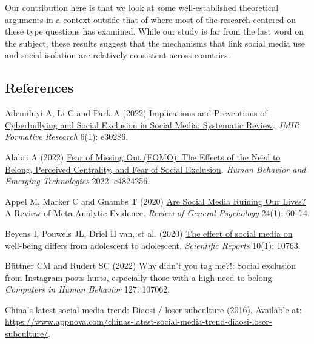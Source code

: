 \documentclass[
  letterpaper,
  DIV=11,
  numbers=noendperiod]{scrartcl}
\newlength{\cslhangindent}
\newlength{\cslentryspacingunit} %
\newenvironment{CSLReferences}[2] %
 {%
  \setlength{\parindent}{0pt}
  \ifodd #1
  \let\oldpar\par
  \def\par{\hangindent=\cslhangindent\oldpar}
  \fi
  \setlength{\parskip}{#2\cslentryspacingunit}
 }%
 {}
\begin{document}
Our contribution here is that we look at some well-established
theoretical arguments in a context outside that of where most of the
research centered on these type questions has examined. While our study
is far from the last word on the subject, these results suggest that the
mechanisms that link social media use and social isolation are
relatively consistent across countries.

\newpage{}

\hypertarget{references}{%
\subsection{References}\label{references}}

\hypertarget{refs}{}
\begin{CSLReferences}{1}{0}
\leavevmode{}%
Ademiluyi A, Li C and Park A (2022)
\href{https://doi.org/10.2196/30286}{Implications and Preventions of
Cyberbullying and Social Exclusion in Social Media: Systematic Review}.
\emph{JMIR Formative Research} 6(1): e30286.

\leavevmode{}%
Alabri A (2022) \href{https://doi.org/10.1155/2022/4824256}{Fear of
Missing Out (FOMO): The Effects of the Need to Belong, Perceived
Centrality, and Fear of Social Exclusion}. \emph{Human Behavior and
Emerging Technologies} 2022: e4824256.

\leavevmode{}%
Appel M, Marker C and Gnambs T (2020)
\href{https://doi.org/10.1177/1089268019880891}{Are Social Media Ruining
Our Lives? A Review of Meta-Analytic Evidence}. \emph{Review of General
Psychology} 24(1): 60--74.

\leavevmode{}%
Beyens I, Pouwels JL, Driel II van, et al. (2020)
\href{https://doi.org/10.1038/s41598-020-67727-7}{The effect of social
media on well-being differs from adolescent to adolescent}.
\emph{Scientific Reports} 10(1): 10763.

\leavevmode{}%
Büttner CM and Rudert SC (2022)
\href{https://doi.org/10.1016/j.chb.2021.107062}{Why didn't you tag
me?!: Social exclusion from Instagram posts hurts, especially those with
a high need to belong}. \emph{Computers in Human Behavior} 127: 107062.

\leavevmode{}%
China{'}s latest social media trend: Diaosi / loser subculture (2016).
Available at:
\url{https://www.appnova.com/chinas-latest-social-media-trend-diaosi-loser-subculture/}.


\end{CSLReferences}
\end{document}
